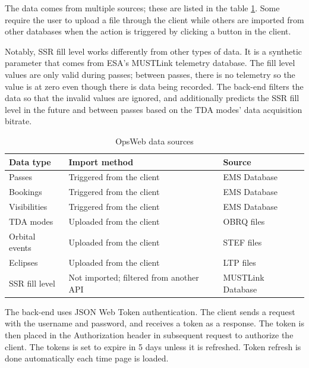 The data comes from multiple sources; these are listed in the table \ref{tab:opsweb_data_sources}. Some require the user to upload a file through the client while others are imported from other databases when the action is triggered by clicking a button in the client.

Notably, SSR fill level works differently from other types of data. It is a synthetic parameter that comes from ESA's MUSTLink telemetry database. The fill level values are only valid during passes; between passes, there is no telemetry so the value is at zero even though there is data being recorded. The back-end filters the data so that the invalid values are ignored, and additionally predicts the SSR fill level in the future and between passes based on the TDA modes' data acquisition bitrate.

\begin{table}[!ht]
\def\arraystretch{1.1}%
\begin{center}
  \caption{OpsWeb data sources}
  \label{tab:opsweb_data_sources}
  \begin{tabular}{| l | l | l | }
    \hline
    Data type & Import method & Source \\
    \hline
    Passes & Triggered from the client & EMS Database  \\
    Bookings & Triggered from the client & EMS Database  \\
    Visibilities & Triggered from the client & EMS Database  \\
    TDA modes & Uploaded from the client & OBRQ files  \\
    Orbital events & Uploaded from the client & STEF files \\
    Eclipses & Uploaded from the client & LTP files \\
    SSR fill level & Not imported; filtered from another API & MUSTLink Database \\
    \hline
  \end{tabular}

  \end{center}
\end{table}

The back-end uses JSON Web Token authentication. The client sends a request with the username and password, and receives a token as a response. The token is then placed in the Authorization header in subsequent request to authorize the client. The tokens is set to expire in 5 days unless it is refreshed. Token refresh is done automatically each time page is loaded. \cite{jwt}


